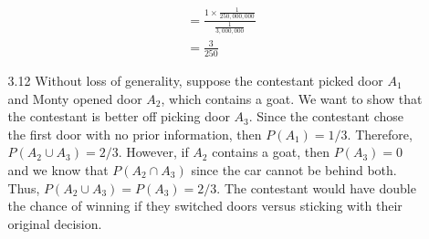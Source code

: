\documentclass[letterpaper,12pt]{article}
\theoremstyle{definition}
\begin{document}
\begin{enumerate}
\begin{enumerate}
\begin{align*}
        &= \frac{1 \times \frac{1}{250,000,000}}{\frac{1}{3,000,000}} \\
        &= \frac{3}{250}
      \end{align*}
    \item[3.12]
      Without loss of generality, suppose the contestant picked door $A_1$ and Monty opened door $A_2$, which contains a goat. We want to show that the contestant is better off picking door $A_3$. Since the contestant chose the first door with no prior information, then $P(A_1)=1/3$. Therefore, $P(A_2 \cup A_3)=2/3$. However, if $A_2$ contains a goat, then $P(A_3)=0$ and we know that $P(A_2 \cap A_3)$ since the car cannot be behind both. Thus, $P(A_2 \cup A_3)=P(A_3)=2/3$. The contestant would have double the chance of winning if they switched doors versus sticking with their original decision.


\end{enumerate}
\end{enumerate}
\end{document}

